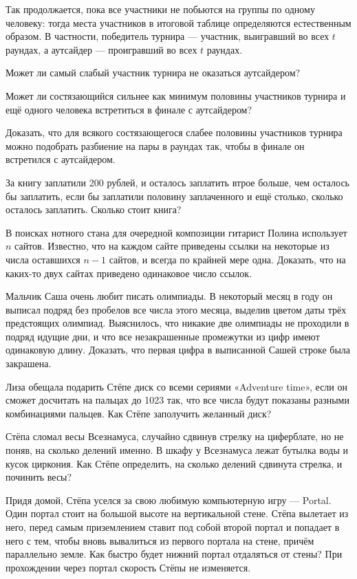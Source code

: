 \ms Так продолжается, пока все участники не побьются на группы по одному человеку: тогда места участников в итоговой таблице определяются естественным образом. В частности, победитель турнира — участник, выигравший во всех $t$ раундах, а аутсайдер — проигравший во всех $t$ раундах.

\begin{itemize}
\itA Может ли самый слабый участник турнира не оказаться аутсайдером?

\itB Может ли состязающийся сильнее как минимум половины участников турнира и ещё одного человека встретиться в финале с аутсайдером?

\itC Доказать, что для всякого состязающегося слабее половины участников турнира можно подобрать разбиение на пары в раундах так, чтобы в финале он встретился с аутсайдером.
\end{itemize}

\begin{itemize}
\itA За книгу заплатили 200 рублей, и осталось заплатить втрое больше, чем осталось бы заплатить, если бы заплатили половину заплаченного и ещё столько, сколько осталось заплатить. Сколько стоит книга?

\itB В поисках нотного стана для очередной композиции гитарист Полина использует $n$ сайтов. Известно, что на каждом сайте приведены ссылки на некоторые из числа оставшихся $n-1$ сайтов, и всегда по крайней мере одна. Доказать, что на каких-то двух сайтах приведено одинаковое число ссылок.

\itC Мальчик Саша очень любит писать олимпиады. В некоторый месяц в году он выписал подряд без пробелов все числа этого месяца, выделив цветом даты трёх предстоящих олимпиад. Выяснилось, что никакие две олимпиады не проходили в подряд идущие дни, и что все незакрашенные промежутки из цифр имеют одинаковую длину. Доказать, что первая цифра в выписанной Сашей строке была закрашена.
\end{itemize}

\begin{itemize}
\itA Лиза обещала подарить Стёпе диск со всеми сериями «Adventure time», если он сможет досчитать на пальцах до 1023 так, что все числа будут показаны разными комбинациями пальцев. Как Стёпе заполучить желанный диск?

\itB Стёпа сломал весы Всезнамуса, случайно сдвинув стрелку на циферблате, но не поняв, на сколько делений именно. В шкафу у Всезнамуса лежат бутылка воды и кусок циркония. Как Стёпе определить, на сколько делений сдвинута стрелка, и починить весы?

\itC Придя домой, Стёпа уселся за свою любимую компьютерную игру — Portal. Один портал стоит на большой высоте на вертикальной стене. Стёпа вылетает из него, перед самым приземлением ставит под собой второй портал и попадает в него с тем, чтобы вновь вывалиться из первого портала на стене, причём параллельно земле. Как быстро будет нижний портал отдаляться от стены? При прохождении через портал скорость Стёпы не изменяется.
\end{itemize}


